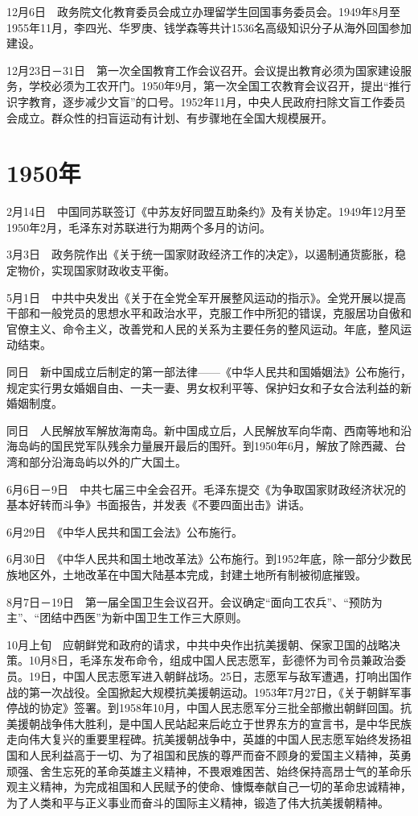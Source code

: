 \documentclass[10pt,a4paper,twocolumn]{book}
\begin{document}
12月6日　政务院文化教育委员会成立办理留学生回国事务委员会。1949年8月至1955年11月，李四光、华罗庚、钱学森等共计1536名高级知识分子从海外回国参加建设。

12月23日－31日　第一次全国教育工作会议召开。会议提出教育必须为国家建设服务，学校必须为工农开门。1950年9月，第一次全国工农教育会议召开，提出“推行识字教育，逐步减少文盲”的口号。1952年11月，中央人民政府扫除文盲工作委员会成立。群众性的扫盲运动有计划、有步骤地在全国大规模展开。

\section{1950年}

2月14日　中国同苏联签订《中苏友好同盟互助条约》及有关协定。1949年12月至1950年2月，毛泽东对苏联进行为期两个多月的访问。

3月3日　政务院作出《关于统一国家财政经济工作的决定》，以遏制通货膨胀，稳定物价，实现国家财政收支平衡。

5月1日　中共中央发出《关于在全党全军开展整风运动的指示》。全党开展以提高干部和一般党员的思想水平和政治水平，克服工作中所犯的错误，克服居功自傲和官僚主义、命令主义，改善党和人民的关系为主要任务的整风运动。年底，整风运动结束。

同日　新中国成立后制定的第一部法律——《中华人民共和国婚姻法》公布施行，规定实行男女婚姻自由、一夫一妻、男女权利平等、保护妇女和子女合法利益的新婚姻制度。

同日　人民解放军解放海南岛。新中国成立后，人民解放军向华南、西南等地和沿海岛屿的国民党军队残余力量展开最后的围歼。到1950年6月，解放了除西藏、台湾和部分沿海岛屿以外的广大国土。

6月6日－9日　中共七届三中全会召开。毛泽东提交《为争取国家财政经济状况的基本好转而斗争》书面报告，并发表《不要四面出击》讲话。

6月29日　《中华人民共和国工会法》公布施行。

6月30日　《中华人民共和国土地改革法》公布施行。到1952年底，除一部分少数民族地区外，土地改革在中国大陆基本完成，封建土地所有制被彻底摧毁。

8月7日－19日　第一届全国卫生会议召开。会议确定“面向工农兵”、“预防为主”、“团结中西医”为新中国卫生工作三大原则。

10月上旬　应朝鲜党和政府的请求，中共中央作出抗美援朝、保家卫国的战略决策。10月8日，毛泽东发布命令，组成中国人民志愿军，彭德怀为司令员兼政治委员。19日，中国人民志愿军进入朝鲜战场。25日，志愿军与敌军遭遇，打响出国作战的第一次战役。全国掀起大规模抗美援朝运动。1953年7月27日，《关于朝鲜军事停战的协定》签署。到1958年10月，中国人民志愿军分三批全部撤出朝鲜回国。抗美援朝战争伟大胜利，是中国人民站起来后屹立于世界东方的宣言书，是中华民族走向伟大复兴的重要里程碑。抗美援朝战争中，英雄的中国人民志愿军始终发扬祖国和人民利益高于一切、为了祖国和民族的尊严而奋不顾身的爱国主义精神，英勇顽强、舍生忘死的革命英雄主义精神，不畏艰难困苦、始终保持高昂士气的革命乐观主义精神，为完成祖国和人民赋予的使命、慷慨奉献自己一切的革命忠诚精神，为了人类和平与正义事业而奋斗的国际主义精神，锻造了伟大抗美援朝精神。
\end{document}
